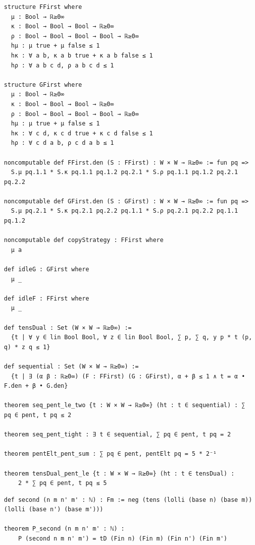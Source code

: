 \label{lean:pent-bounds}
\begin{lstlisting}
structure FFirst where
  μ : Bool → ℝ≥0∞
  κ : Bool → Bool → Bool → ℝ≥0∞
  ρ : Bool → Bool → Bool → Bool → ℝ≥0∞
  hμ : μ true + μ false ≤ 1
  hκ : ∀ a b, κ a b true + κ a b false ≤ 1
  hρ : ∀ a b c d, ρ a b c d ≤ 1

structure GFirst where
  μ : Bool → ℝ≥0∞
  κ : Bool → Bool → Bool → ℝ≥0∞
  ρ : Bool → Bool → Bool → Bool → ℝ≥0∞
  hμ : μ true + μ false ≤ 1
  hκ : ∀ c d, κ c d true + κ c d false ≤ 1
  hρ : ∀ c d a b, ρ c d a b ≤ 1

noncomputable def FFirst.den (S : FFirst) : W × W → ℝ≥0∞ := fun pq =>
  S.μ pq.1.1 * S.κ pq.1.1 pq.1.2 pq.2.1 * S.ρ pq.1.1 pq.1.2 pq.2.1 pq.2.2

noncomputable def GFirst.den (S : GFirst) : W × W → ℝ≥0∞ := fun pq =>
  S.μ pq.2.1 * S.κ pq.2.1 pq.2.2 pq.1.1 * S.ρ pq.2.1 pq.2.2 pq.1.1 pq.1.2

noncomputable def copyStrategy : FFirst where
  μ a

def idleG : GFirst where
  μ _

def idleF : FFirst where
  μ _

def tensDual : Set (W × W → ℝ≥0∞) :=
  {t | ∀ y ∈ lin Bool Bool, ∀ z ∈ lin Bool Bool, ∑ p, ∑ q, y p * t (p, q) * z q ≤ 1}

def sequential : Set (W × W → ℝ≥0∞) :=
  {t | ∃ (α β : ℝ≥0∞) (F : FFirst) (G : GFirst), α + β ≤ 1 ∧ t = α • F.den + β • G.den}

theorem seq_pent_le_two {t : W × W → ℝ≥0∞} (ht : t ∈ sequential) : ∑ pq ∈ pent, t pq ≤ 2

theorem seq_pent_tight : ∃ t ∈ sequential, ∑ pq ∈ pent, t pq = 2

theorem pentElt_pent_sum : ∑ pq ∈ pent, pentElt pq = 5 * 2⁻¹

theorem tensDual_pent_le {t : W × W → ℝ≥0∞} (ht : t ∈ tensDual) :
    2 * ∑ pq ∈ pent, t pq ≤ 5
\end{lstlisting}

\label{lean:p-second}
\begin{lstlisting}
def second (n m n' m' : ℕ) : Fm := neg (tens (lolli (base n) (base m)) (lolli (base n') (base m')))

theorem P_second (n m n' m' : ℕ) :
    P (second n m n' m') = tD (Fin n) (Fin m) (Fin n') (Fin m')
\end{lstlisting}

